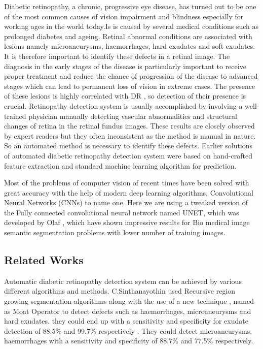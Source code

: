 \documentclass[conference]{IEEEtran}
\begin{document}
Diabetic retinopathy, a chronic, progressive eye disease, has turned out to be one of the most common causes of vision impairment and blindness especially for working ages in the world today\cite{1}.Is is caused by several medical conditions such as prolonged diabetes and ageing. Retinal abnormal conditions are associated with lesions namely microaneurysms, haemorrhages, hard exudates and soft exudates. It is therefore important to identify these defects in a retinal image. The diagnosis in the early stages of the disease is particularly important to receive proper treatment and reduce the chance of progression of the disease to advanced stages which can lead to permanent loss of vision in extreme cases\cite{2}. The presence of these lesions is highly correlated with DR , so detection of their presence is crucial. Retinopathy detection system is usually accomplished by involving a well-trained physician manually detecting vascular abnormalities and structural changes of retina in the retinal fundus images. These results are closely observed by expert readers but they often inconsistent as the method is manual in nature\cite{8}. So an automated method is necessary to identify these defects. Earlier solutions of automated diabetic retinopathy detection system were based on hand-crafted feature extraction and standard machine learning algorithm for prediction\cite{3}. 
\par
Most of the problems of computer vision of recent times have been solved with great accuracy with the help of modern deep learning algorithms, Convolutional Neural Networks (CNNs) to name one. Here we are using a tweaked version of the Fully connected convolutional neural network named UNET, which was developed by Olaf \cite{unet}, which have shown impressive results for Bio medical image semantic segmentation problems with lower number of training images.

\subsection{Related Works}
\par

Automatic diabetic retinopathy detection system can be achieved by various different algorithms and methods. C.Sinthanayothin used Recursive region growing segmentation algorithms along with the use of a new technique , named as Moat Operator to detect defects such as haemorrhages, microaneurysms and hard exudates. they could end up with a sensitivity and specificity for exudate detection of 88.5\% and 99.7\% respectively . They could detect microaneurysms, haemorrhages with a sensitivity and specificity of 88.7\% and 77.5\% respectively. 
\par
\end{document}

